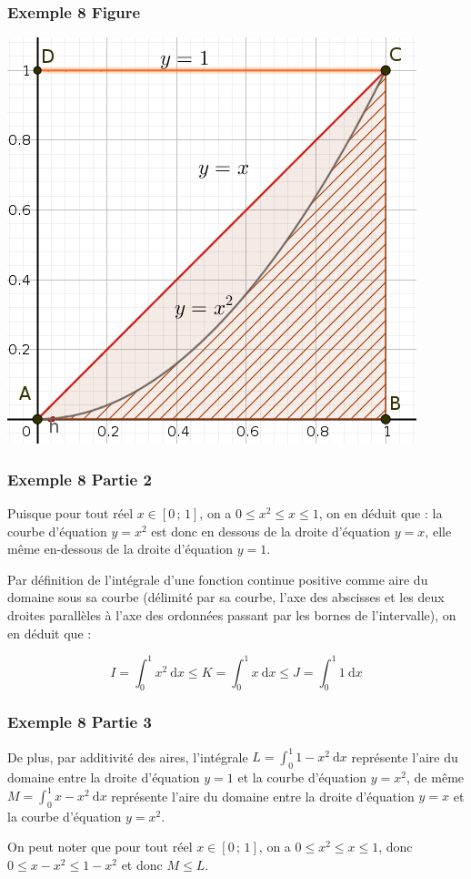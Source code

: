 \documentclass[11pt, hyperref={urlcolor=red,%
            linkcolor=blue, %
            colorlinks=true}]{beamer}
\newcommand{\Interff}[2]{\left[#1\, ;\, #2\right]}
\newcommand{\dx}{\ensuremath{\text{d}x}}		%
\begin{document}
\begin{frame}
\frametitle{Exemple 8 Figure }


\begin{center}
\includegraphics[scale=0.3]{images/exemple8.png}
\end{center}

\end{frame}


\begin{frame}
\frametitle{Exemple 8 Partie 2 }

Puisque pour tout réel $x \in \Interff{0}{1}$, on a $0  \leqslant x^{2}   \leqslant x  \leqslant 1$, on en déduit que : la courbe d'équation $y=x^2$ est donc en dessous de la droite d'équation $y=x$, elle même en-dessous de la droite d'équation $y=1$.

Par définition de l'intégrale d'une fonction continue positive comme aire du domaine  \og{} sous sa courbe \fg{} (délimité par sa courbe, l'axe des abscisses et les deux droites parallèles à l'axe des ordonnées passant par les bornes de l'intervalle), on en déduit que :

$$I= \int_{0}^{1}x^2 \ \dx \leqslant K= \int_{0}^{1} x \ \dx  \leqslant J = \int_{0}^{1} 1 \ \dx$$
 

\end{frame}



\begin{frame}
\frametitle{Exemple 8 Partie 3 }


De plus, par additivité des aires, l'intégrale   $L=\int_{0}^{1} 1-x^2  \ \dx$ représente l'aire du domaine entre la droite d'équation $y=1$ et la courbe d'équation $y=x^2$, de même   $M=\int_{0}^{1} x-x^2  \ \dx$ représente l'aire du domaine entre la droite d'équation $y=x$ et la courbe d'équation $y=x^2$.

On peut noter que pour tout réel $x \in \Interff{0}{1}$, on a $0  \leqslant x^{2}   \leqslant x  \leqslant 1$, donc $0 \leqslant x - x^{2} \leqslant 1- x^{2}$ et donc $M \leqslant L$.  

\end{frame}
\end{document}
